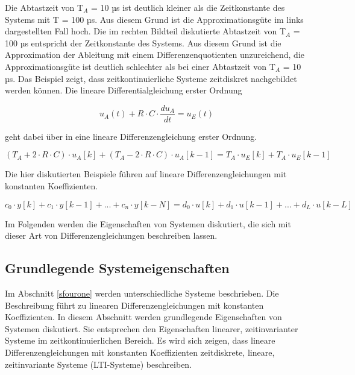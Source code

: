 \noindent Die Abtastzeit von T${}_{A}$ = 10 µs ist deutlich kleiner als die Zeitkonstante des Systems mit T = 100 µs. Aus diesem Grund ist die Approximationsg\"{u}te im links dargestellten Fall hoch. Die im rechten Bildteil diskutierte Abtastzeit von T${}_{A}$ = 100 µs entspricht der Zeitkonstante des Systems. Aus diesem Grund ist die Approximation der Ableitung mit einem Differenzenquotienten unzureichend, die Approximationsg\"{u}te ist deutlich schlechter als bei einer Abtastzeit von T${}_{A}$ = 10 µs. Das Beispiel zeigt, dass zeitkontinuierliche Systeme zeitdiskret nachgebildet werden k\"{o}nnen. Die lineare Differentialgleichung erster Ordnung 

\begin{equation}\label{eq:fourseventeen}
u_{A} \left(t\right)+R\cdot C\cdot \frac{du_{A} }{dt} =u_{E} \left(t\right)
\end{equation}

\noindent geht dabei \"{u}ber in eine lineare Differenzengleichung erster Ordnung.

\begin{equation}\label{eq:foureighteen}
\left(T_{A} +2\cdot R\cdot C\right)\cdot u_{A} \left[k\right]+\left(T_{A} -2\cdot R\cdot C\right)\cdot u_{A} \left[k-1\right]=T_{A} \cdot u_{E} \left[k\right]+T_{A} \cdot u_{E} \left[k-1\right]
\end{equation}

\noindent Die hier diskutierten Beispiele f\"{u}hren auf lineare Differenzengleichungen mit konstanten Koeffizienten.

\begin{equation}\label{eq:fournineteen}
c_{0} \cdot y\left[k\right]+c_{1} \cdot y\left[k-1\right]+...+c_{n} \cdot y\left[k-N\right]=d_{0} \cdot u\left[k\right]+d_{1} \cdot u\left[k-1\right]+...+d_{L} \cdot u\left[k-L\right]
\end{equation}

\noindent Im Folgenden werden die Eigenschaften von Systemen diskutiert, die sich mit dieser Art von Differenzengleichungen beschreiben lassen.

\clearpage

\subsection{Grundlegende Systemeigenschaften}\label{threetwo}

\noindent Im Abschnitt \ref{sfourone} werden unterschiedliche Systeme beschrieben. Die Beschreibung f\"{u}hrt zu linearen Differenzengleichungen mit konstanten Koeffizienten. In diesem Abschnitt werden grundlegende Eigenschaften von Systemen diskutiert. Sie entsprechen den Eigenschaften linearer, zeitinvarianter Systeme im zeitkontinuierlichen Bereich. Es wird sich zeigen, dass lineare Differenzengleichungen mit konstanten Koeffizienten zeitdiskrete, lineare, zeitinvariante Systeme (LTI-Systeme) beschreiben.

